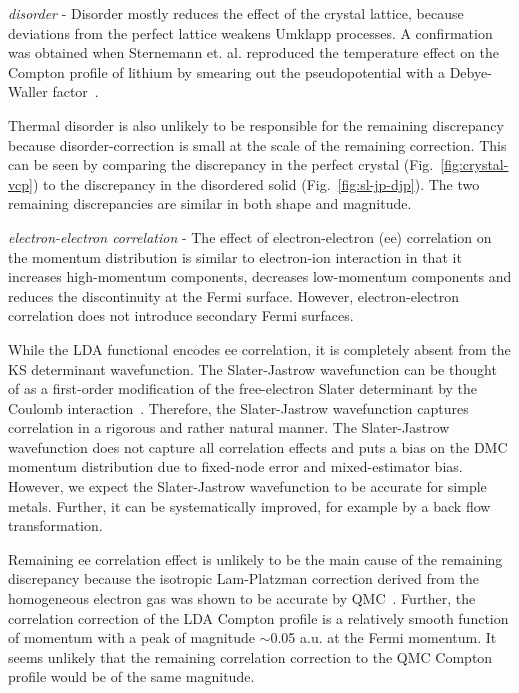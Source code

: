 \documentclass[aps,prb,showpacs,preprintnumbers,amsmath,amssymb,superscriptaddress,twocolumn]{revtex4-1}
\begin{document}
\emph{disorder} - Disorder mostly reduces the effect of the crystal lattice, because deviations from the perfect lattice weakens Umklapp processes. A confirmation was obtained when Sternemann et. al. reproduced the temperature effect on the Compton profile of lithium by smearing out the pseudopotential with a Debye-Waller factor~\cite{Sternemann2001}.

Thermal disorder is also unlikely to be responsible for the remaining discrepancy because disorder-correction is small at the scale of the remaining correction. This can be seen by comparing the discrepancy in the perfect crystal (Fig.~\ref{fig:crystal-vcp}) to the discrepancy in the disordered solid (Fig.~\ref{fig:sl-jp-djp}). The two remaining discrepancies are similar in both shape and magnitude.


\emph{electron-electron correlation} - The effect of electron-electron (ee) correlation on the momentum distribution is similar to electron-ion interaction in that it increases high-momentum components, decreases low-momentum components and reduces the discontinuity at the Fermi surface. However, electron-electron correlation does not introduce secondary Fermi surfaces.

While the LDA functional encodes ee correlation, it is completely absent from the KS determinant wavefunction. The Slater-Jastrow wavefunction can be thought of as a first-order modification of the free-electron Slater determinant by the Coulomb interaction~\cite{Holzmann2003}. Therefore, the Slater-Jastrow wavefunction captures correlation in a rigorous and rather natural manner. The Slater-Jastrow wavefunction does not capture all correlation effects and puts a bias on the DMC momentum distribution due to fixed-node error and mixed-estimator bias. However, we expect the Slater-Jastrow wavefunction to be accurate for simple metals. Further, it can be systematically improved, for example by a back flow transformation.

Remaining ee correlation effect is unlikely to be the main cause of the remaining discrepancy because the isotropic Lam-Platzman correction derived from the homogeneous electron gas was shown to be accurate by QMC~\cite{Filippi1999,Bross2005}. Further, the correlation correction of the LDA Compton profile is a relatively smooth function of momentum with a peak of magnitude $\sim$0.05 a.u. at the Fermi momentum. It seems unlikely that the remaining correlation correction to the QMC Compton profile would be of the same magnitude.
\end{document}
